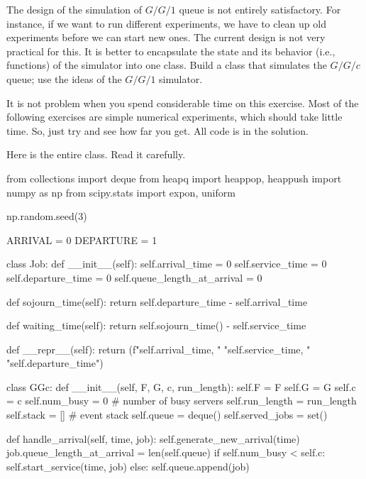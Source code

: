 \begin{exercise}
  The design of the simulation of $G/G/1$ queue is not entirely satisfactory. For instance, if we want to run different experiments, we have to clean up old experiments before we can start new ones. The current design is not very practical for this. It is better to encapsulate the state and its behavior (i.e., functions) of the simulator into one class. Build a class that simulates the $G/G/c$ queue; use the ideas of the $G/G/1$ simulator.

It is not  problem when you spend considerable time on this exercise. Most of the following exercises are simple numerical experiments, which should take little time. So, just try and see how far you get. All code is in the solution.

\begin{solution}
Here is the entire class. Read it carefully.   


\begin{pyblock}
from collections import deque
from heapq import heappop, heappush
import numpy as np
from scipy.stats import expon, uniform

np.random.seed(3)

ARRIVAL = 0
DEPARTURE = 1


class Job:
    def __init__(self):
        self.arrival_time = 0
        self.service_time = 0
        self.departure_time = 0
        self.queue_length_at_arrival = 0

    def sojourn_time(self):
        return self.departure_time - self.arrival_time

    def waiting_time(self):
        return self.sojourn_time() - self.service_time

    def __repr__(self):
        return (f"{self.arrival_time}, "
                 "{self.service_time}, "
                 "{self.departure_time}\n")



class GGc:
    def __init__(self, F, G, c, run_length):
        self.F = F
        self.G = G
        self.c = c
        self.num_busy = 0   # number of busy servers
        self.run_length = run_length
        self.stack = [] # event stack
        self.queue = deque()
        self.served_jobs = set()

    def handle_arrival(self, time, job):
        self.generate_new_arrival(time)
        job.queue_length_at_arrival = len(self.queue)
        if self.num_busy < self.c:
            self.start_service(time, job)
        else:
            self.queue.append(job)


\end{pyblock}
\end{solution}
\end{exercise}
